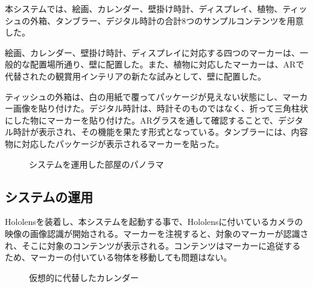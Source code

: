 本システムでは、絵画、カレンダー、壁掛け時計、ディスプレイ、植物、ティッシュの外箱、タンブラー、デジタル時計の合計8つのサンプルコンテンツを用意した。

絵画、カレンダー、壁掛け時計、ディスプレイに対応する四つのマーカーは、一般的な配置場所通り、壁に配置した。また、植物に対応したマーカーは、ARで代替されたの観賞用インテリアの新たな試みとして、壁に配置した。

ティッシュの外箱は、白の用紙で覆ってパッケージが見えない状態にし、マーカー画像を貼り付けた。デジタル時計は、時計そのものではなく、折って三角柱状にした物にマーカーを貼り付けた。ARグラスを通して確認することで、デジタル時計が表示され、その機能を果たす形式となっている。タンブラーには、内容物に対応したパッケージが表示されるマーカーを貼った。

\begin{figure}[htbp]
  \begin{center}
  \end{center}
  \caption{システムを運用した部屋のパノラマ}
  \label{fig:room-panorama}
\end{figure}

\subsection{システムの運用}

Hololensを装着し、本システムを起動する事で、Hololensに付いているカメラの映像の画像認識が開始される。マーカーを注視すると、対象のマーカーが認識され、そこに対象のコンテンツが表示される。コンテンツはマーカーに追従するため、マーカーの付いている物体を移動しても問題はない。

\begin{figure}[htbp]
  \begin{center}
  \end{center}
  \caption{仮想的に代替したカレンダー}
\end{figure}

